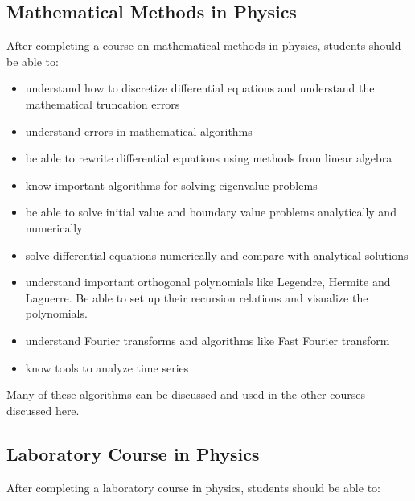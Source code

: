\documentclass[graybox,envcountchap,sectrefs]{svmult}
\begin{document}
\subsection{Mathematical Methods in  Physics}
After completing a course on mathematical methods in physics, students should be able to:
\begin{itemize}
\item understand how to discretize differential equations and understand the mathematical truncation errors

\item understand errors in mathematical algorithms

\item be able to rewrite differential equations using methods from linear algebra

\item know important algorithms for solving eigenvalue problems

\item be able to solve initial value and boundary value problems analytically and numerically

\item solve differential equations numerically and compare with analytical solutions

\item understand  important orthogonal polynomials like Legendre, Hermite and Laguerre. Be able to set up their recursion relations and visualize the polynomials.

\item understand Fourier transforms and algorithms like Fast Fourier transform

\item know tools to analyze time series
\end{itemize}


Many of these algorithms can be discussed and used in the other courses discussed here.

\subsection{Laboratory Course in Physics}
After completing a  laboratory course in physics, students should be able to:
\end{document}
